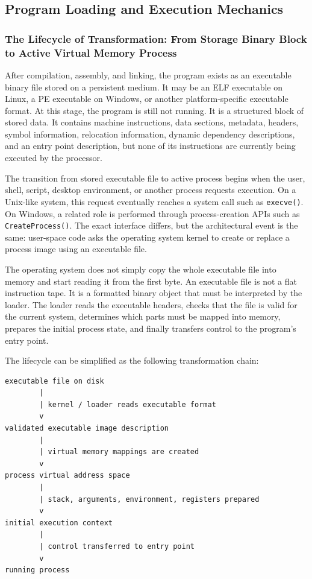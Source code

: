 \subsection{Program Loading and Execution Mechanics}

\subsubsection{The Lifecycle of Transformation: From Storage Binary Block to Active Virtual Memory Process}

After compilation, assembly, and linking, the program exists as an executable binary file stored on a persistent medium. It may be an ELF executable on Linux, a PE executable on Windows, or another platform-specific executable format. At this stage, the program is still not running. It is a structured block of stored data. It contains machine instructions, data sections, metadata, headers, symbol information, relocation information, dynamic dependency descriptions, and an entry point description, but none of its instructions are currently being executed by the processor.

The transition from stored executable file to active process begins when the user, shell, script, desktop environment, or another process requests execution. On a Unix-like system, this request eventually reaches a system call such as \texttt{execve()}. On Windows, a related role is performed through process-creation APIs such as \texttt{CreateProcess()}. The exact interface differs, but the architectural event is the same: user-space code asks the operating system kernel to create or replace a process image using an executable file.

The operating system does not simply copy the whole executable file into memory and start reading it from the first byte. An executable file is not a flat instruction tape. It is a formatted binary object that must be interpreted by the loader. The loader reads the executable headers, checks that the file is valid for the current system, determines which parts must be mapped into memory, prepares the initial process state, and finally transfers control to the program's entry point.

The lifecycle can be simplified as the following transformation chain:

\begin{verbatim}
executable file on disk
        |
        | kernel / loader reads executable format
        v
validated executable image description
        |
        | virtual memory mappings are created
        v
process virtual address space
        |
        | stack, arguments, environment, registers prepared
        v
initial execution context
        |
        | control transferred to entry point
        v
running process
\end{verbatim}


